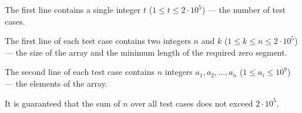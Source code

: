 The first line contains a single integer $t$ ($1 \le t \le 2 \cdot 10^5$) --- the number of test cases.

The first line of each test case contains two integers $n$ and $k$ ($1 \le k \le n \le 2 \cdot 10^5$) --- the size of the array and the minimum length of the required zero segment.

The second line of each test case contains $n$ integers $a_1, a_2, \ldots, a_n$ ($1 \le a_i \le 10^9$) --- the elements of the array.

It is guaranteed that the sum of $n$ over all test cases does not exceed $2 \cdot 10^5$.
